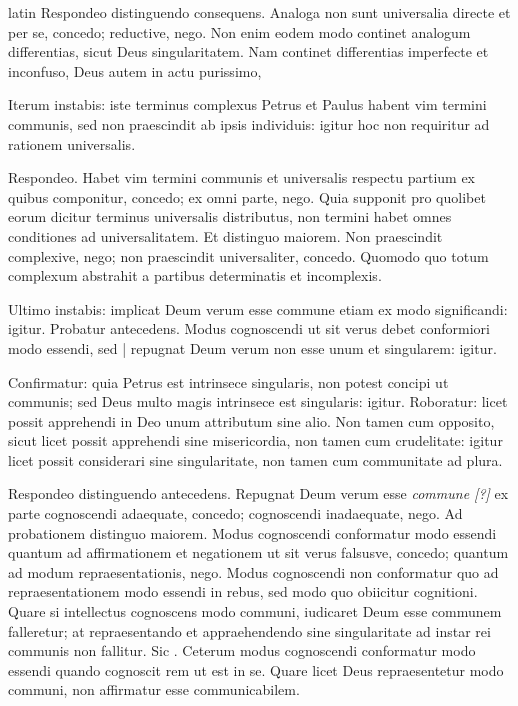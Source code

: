 \begin{otherlanguage*}{latin}
\pstart
Respondeo distinguendo consequens. Analoga non sunt universalia directe et per se, concedo; reductive, nego. Non enim eodem modo continet analogum differentias, sicut Deus singularitatem. Nam continet differentias imperfecte et inconfuso, Deus autem in actu purissimo, 
\pend

\pstart
Iterum instabis:
iste terminus complexus Petrus et Paulus habent vim termini communis, sed non praescindit ab ipsis individuis:
igitur hoc non requiritur ad rationem universalis. 
\pend

\pstart
Respondeo. Habet vim termini communis et universalis respectu partium ex quibus componitur, concedo; ex omni parte, nego. Quia supponit pro quolibet eorum dicitur terminus universalis distributus, non termini habet omnes conditiones ad universalitatem. Et distinguo maiorem. Non praescindit complexive, nego; non praescindit universaliter, concedo. Quomodo quo totum complexum abstrahit a partibus determinatis et incomplexis. 
\pend

\pstart
Ultimo instabis:
implicat Deum verum esse commune etiam ex modo significandi:
igitur. Probatur antecedens. Modus cognoscendi ut sit verus debet conformiori modo essendi, sed \textnormal{|} repugnat Deum verum non esse unum et singularem:
igitur. 
\pend

\pstart
Confirmatur:
quia Petrus est intrinsece singularis, non potest concipi ut communis; sed Deus multo magis intrinsece est singularis:
igitur. Roboratur:
licet possit apprehendi in Deo unum attributum sine alio. Non tamen cum opposito, sicut licet possit apprehendi sine misericordia, non tamen cum crudelitate:
igitur licet possit considerari sine singularitate, non tamen cum communitate ad plura. 
\pend

\pstart
Respondeo distinguendo antecedens. Repugnat Deum verum esse \emph{commune [?]} ex parte cognoscendi adaequate, concedo; cognoscendi inadaequate, nego. Ad probationem distinguo maiorem. Modus cognoscendi conformatur modo essendi quantum ad affirmationem et negationem ut sit verus falsusve, concedo; quantum ad modum repraesentationis, nego. Modus cognoscendi non conformatur quo ad repraesentationem modo essendi in rebus, sed modo quo obiicitur cognitioni. Quare si intellectus cognoscens modo communi, iudicaret Deum esse communem falleretur; at repraesentando et appraehendendo sine singularitate ad instar rei communis non fallitur. Sic . Ceterum modus cognoscendi conformatur modo essendi quando cognoscit rem ut est in se. Quare licet Deus repraesentetur modo communi, non affirmatur esse communicabilem. 
\pend


\end{otherlanguage*}

